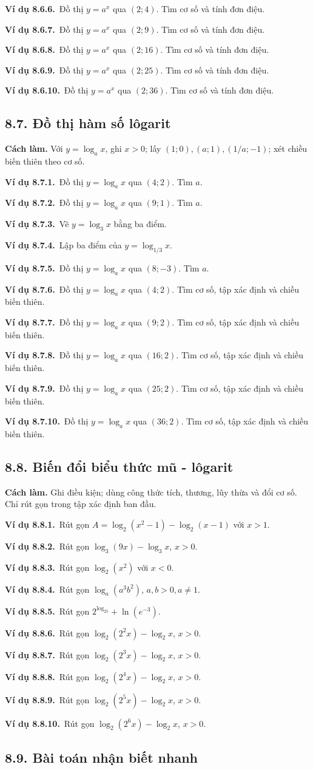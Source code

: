 \documentclass[11pt,a4paper]{article}
\newcommand{\vd}[1]{\par\Needspace{3\baselineskip}\textbf{\color{teal}Ví dụ #1.}\ }
\begin{document}
\vd{8.6.6}Đồ thị $y=a^x$ qua $(2;4)$. Tìm cơ số và tính đơn điệu.
\vd{8.6.7}Đồ thị $y=a^x$ qua $(2;9)$. Tìm cơ số và tính đơn điệu.
\vd{8.6.8}Đồ thị $y=a^x$ qua $(2;16)$. Tìm cơ số và tính đơn điệu.
\vd{8.6.9}Đồ thị $y=a^x$ qua $(2;25)$. Tìm cơ số và tính đơn điệu.
\vd{8.6.10}Đồ thị $y=a^x$ qua $(2;36)$. Tìm cơ số và tính đơn điệu.
\clearpage\subsection{8.7. Đồ thị hàm số lôgarit}
\begin{tcolorbox}\textbf{Cách làm.} Với $y=\log_a x$, ghi $x>0$; lấy $(1;0),(a;1),(1/a;-1)$; xét chiều biến thiên theo cơ số.\end{tcolorbox}
\vd{8.7.1}Đồ thị $y=\log_a x$ qua $(4;2)$. Tìm $a$.
\vd{8.7.2}Đồ thị $y=\log_a x$ qua $(9;1)$. Tìm $a$.
\vd{8.7.3}Vẽ $y=\log_3x$ bằng ba điểm.
\vd{8.7.4}Lập ba điểm của $y=\log_{1/3}x$.
\vd{8.7.5}Đồ thị $y=\log_ax$ qua $(8;-3)$. Tìm $a$.
\vd{8.7.6}Đồ thị $y=\log_ax$ qua $(4;2)$. Tìm cơ số, tập xác định và chiều biến thiên.
\vd{8.7.7}Đồ thị $y=\log_ax$ qua $(9;2)$. Tìm cơ số, tập xác định và chiều biến thiên.
\vd{8.7.8}Đồ thị $y=\log_ax$ qua $(16;2)$. Tìm cơ số, tập xác định và chiều biến thiên.
\vd{8.7.9}Đồ thị $y=\log_ax$ qua $(25;2)$. Tìm cơ số, tập xác định và chiều biến thiên.
\vd{8.7.10}Đồ thị $y=\log_ax$ qua $(36;2)$. Tìm cơ số, tập xác định và chiều biến thiên.
\clearpage\subsection{8.8. Biến đổi biểu thức mũ - lôgarit}
\begin{tcolorbox}\textbf{Cách làm.} Ghi điều kiện; dùng công thức tích, thương, lũy thừa và đổi cơ số. Chỉ rút gọn trong tập xác định ban đầu.\end{tcolorbox}
\vd{8.8.1}Rút gọn $A=\log_2(x^2-1)-\log_2(x-1)$ với $x>1$.
\vd{8.8.2}Rút gọn $\log_3(9x)-\log_3x$, $x>0$.
\vd{8.8.3}Rút gọn $\log_2(x^2)$ với $x<0$.
\vd{8.8.4}Rút gọn $\log_a(a^3b^2)$, $a,b>0,a\ne1$.
\vd{8.8.5}Rút gọn $2^{\log_25}+\ln(e^{-3})$.
\vd{8.8.6}Rút gọn $\log_2(2^{2}x)-\log_2x$, $x>0$.
\vd{8.8.7}Rút gọn $\log_2(2^{3}x)-\log_2x$, $x>0$.
\vd{8.8.8}Rút gọn $\log_2(2^{4}x)-\log_2x$, $x>0$.
\vd{8.8.9}Rút gọn $\log_2(2^{5}x)-\log_2x$, $x>0$.
\vd{8.8.10}Rút gọn $\log_2(2^{6}x)-\log_2x$, $x>0$.
\clearpage\subsection{8.9. Bài toán nhận biết nhanh}
\end{document}
